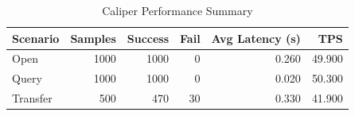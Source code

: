 \begin{table}
\caption{Caliper Performance Summary}
\label{tab:caliper_round}
\begin{tabular}{lrrrrr}
\toprule
Scenario & Samples & Success & Fail & Avg Latency (s) & TPS \\
\midrule
Open & 1000 & 1000 & 0 & 0.260 & 49.900 \\
Query & 1000 & 1000 & 0 & 0.020 & 50.300 \\
Transfer & 500 & 470 & 30 & 0.330 & 41.900 \\
\bottomrule
\end{tabular}
\end{table}
